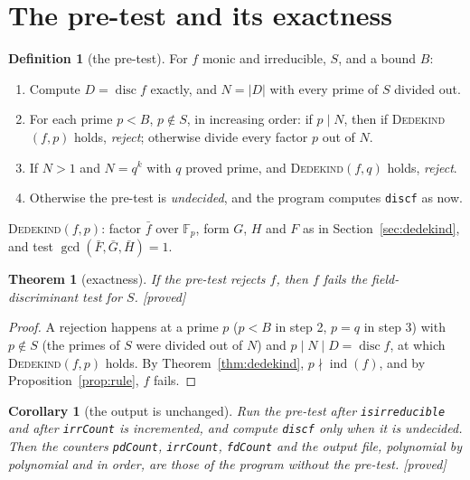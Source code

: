 \documentclass[10pt,a4paper]{article}
\newcommand{\Fp}{\mathbb{F}_p}
\DeclareMathOperator{\disc}{disc}
\DeclareMathOperator{\ind}{ind}
\newcommand{\code}[1]{\texttt{#1}}
\newcommand{\stproved}{\textsf{\small[proved]}\xspace}
\theoremstyle{plain}
\newtheorem{theorem}[proposition]{Theorem}
\newtheorem{corollary}[proposition]{Corollary}
\theoremstyle{definition}
\newtheorem{definition}[proposition]{Definition}
\begin{document}
\section{The pre-test and its exactness}\label{sec:test}

\begin{definition}[the pre-test]
For $f$ monic and irreducible, $S$, and a bound $B$:
\begin{enumerate}[nosep,label=\arabic*.]
\item Compute $D=\disc f$ exactly, and $N=|D|$ with every prime of $S$ divided out.
\item For each prime $p<B$, $p\notin S$, in increasing order: if $p\mid N$, then if \textsc{Dedekind}$(f,p)$ holds, \emph{reject};
  otherwise divide every factor $p$ out of $N$.
\item If $N>1$ and $N=q^k$ with $q$ proved prime, and \textsc{Dedekind}$(f,q)$ holds, \emph{reject}.
\item Otherwise the pre-test is \emph{undecided}, and the program computes \code{discf} as now.
\end{enumerate}
\textsc{Dedekind}$(f,p)$: factor $\bar f$ over $\Fp$, form $G$, $H$ and $F$ as in Section~\ref{sec:dedekind}, and test
$\gcd(\bar F,\bar G,\bar H)=1$.
\end{definition}

\begin{theorem}[exactness]\label{thm:exact}
If the pre-test rejects $f$, then $f$ fails the field-discriminant test for $S$.  \stproved
\end{theorem}

\begin{proof}
A rejection happens at a prime $p$ ($p<B$ in step 2, $p=q$ in step 3) with $p\notin S$ (the primes of $S$ were divided out of $N$) and
$p\mid N\mid D=\disc f$, at which \textsc{Dedekind}$(f,p)$ holds.  By Theorem~\ref{thm:dedekind}, $p\nmid\ind(f)$, and by
Proposition~\ref{prop:rule}, $f$ fails.
\end{proof}

\begin{corollary}[the output is unchanged]\label{cor:output}
Run the pre-test after \code{isirreducible} and after \code{irrCount} is incremented, and compute \code{discf} only when it is
undecided.  Then the counters \code{pdCount}, \code{irrCount}, \code{fdCount} and the output file, polynomial by polynomial and in
order, are those of the program without the pre-test.  \stproved
\end{corollary}
\end{document}
